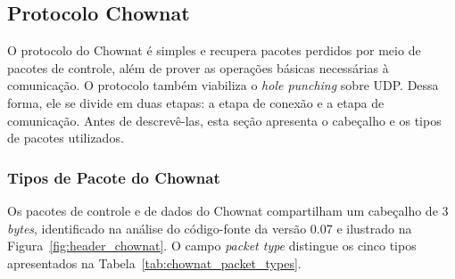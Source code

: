 \subsection{Protocolo Chownat}
\label{sec:chownat_protocol}

O protocolo do Chownat é simples e recupera pacotes perdidos por meio de pacotes de controle, além de prover as operações básicas necessárias à comunicação. O protocolo também viabiliza o \textit{hole punching} sobre UDP. Dessa forma, ele se divide em duas etapas: a etapa de conexão e a etapa de comunicação. Antes de descrevê-las, esta seção apresenta o cabeçalho e os tipos de pacotes utilizados.

\subsubsection{Tipos de Pacote do Chownat}

Os pacotes de controle e de dados do Chownat compartilham um cabeçalho de 3 \textit{bytes}, identificado na análise do código-fonte da versão 0.07 \citep{kamkar2004chownatv07} e ilustrado na Figura~\ref{fig:header_chownat}. O campo \textit{packet type} distingue os cinco tipos apresentados na Tabela~\ref{tab:chownat_packet_types}.

